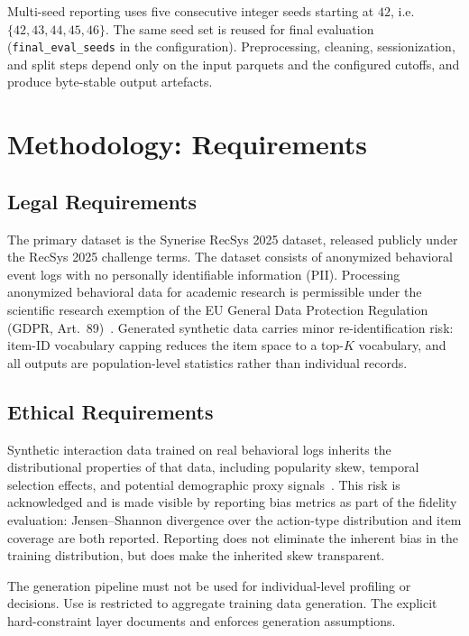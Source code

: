 \documentclass[sigconf,nonacm]{acmart}
\begin{document}
Multi-seed reporting uses five consecutive integer seeds starting at
$42$, i.e.\ $\{42, 43, 44, 45, 46\}$. The same seed set is reused for
final evaluation (\texttt{final\_eval\_seeds} in the configuration). Preprocessing, cleaning, sessionization, and split steps depend only on the input parquets and
the configured cutoffs, and produce byte-stable
output artefacts.


\section{Methodology: Requirements}
\label{sec:method-requirements}

\subsection{Legal Requirements}
The primary dataset is the Synerise RecSys 2025 dataset, released publicly
under the RecSys 2025 challenge terms. The dataset consists of anonymized
behavioral event logs with no personally identifiable information (PII).
Processing anonymized behavioral data for academic research is permissible
under the scientific research exemption of the EU General Data Protection
Regulation (GDPR, Art.~89)~\cite{gdpr2016}. Generated synthetic data carries
minor re-identification risk: item-ID vocabulary capping reduces the item space
to a top-$K$ vocabulary, and all outputs are population-level statistics
rather than individual records.

\subsection{Ethical Requirements}
Synthetic interaction data trained on real behavioral logs inherits the
distributional properties of that data, including popularity skew, temporal
selection effects, and potential demographic proxy
signals~\cite{jordon2022synthetic,chaney2021challenges}. This risk is
acknowledged and is made visible by reporting bias metrics as part of the
fidelity evaluation: Jensen--Shannon divergence over the action-type
distribution and item coverage are both reported. Reporting does not
eliminate the inherent bias in the training distribution, but does make the
inherited skew transparent.

The generation pipeline must not be used for individual-level profiling or
decisions. Use is restricted to aggregate training data generation. The
explicit hard-constraint layer documents and enforces generation assumptions.
\end{document}
